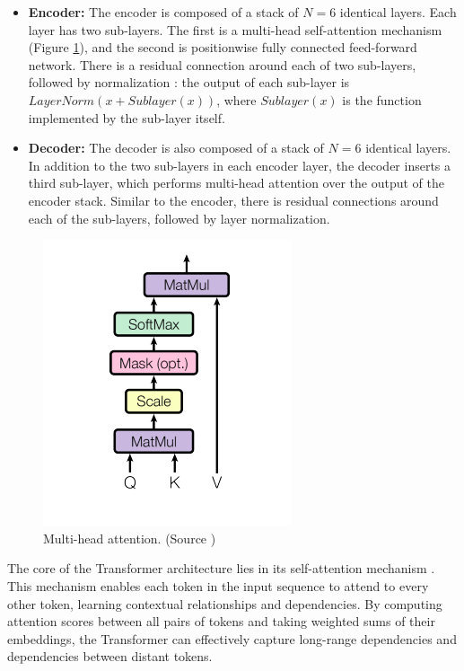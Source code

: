 \begin{itemize}
  \item \textbf{Encoder:} The encoder is composed of a stack of $N=6$ identical layers. Each layer has two
  sub-layers. The first is a multi-head self-attention mechanism (Figure \ref{fig:transformer_multihead}), and the second is positionwise fully
  connected feed-forward network. There is a residual connection \cite{DeepResidual2016} around each of two sub-layers, followed by normalization \cite{ba2016layer}: the output of each sub-layer is $LayerNorm(x + Sublayer(x))$, where $Sublayer(x)$ is the function implemented by the sub-layer
  itself.
  \item \textbf{Decoder:} The decoder is also composed of a stack of $N=6$ identical layers. In addition to the two
  sub-layers in each encoder layer, the decoder inserts a third sub-layer, which performs multi-head
  attention over the output of the encoder stack. Similar to the encoder, there is residual connections
  around each of the sub-layers, followed by layer normalization.
\end{itemize}

\begin{figure}
  \centering
  \includegraphics[width=0.5\linewidth]{text/chapter_03/imgs/multihead}
  \caption{Multi-head attention. (Source \cite{vaswani2023attention})}
  \label{fig:transformer_multihead}
\end{figure}


The core of the Transformer architecture lies in its self-attention mechanism \cite{vaswani2023attention}. This mechanism enables each token in the input sequence to attend to every other token, learning contextual relationships and dependencies. By computing attention scores between all pairs of tokens and taking weighted sums of their embeddings, the Transformer can effectively capture long-range dependencies and dependencies between distant tokens.

